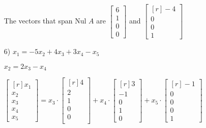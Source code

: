 \documentclass{article}
\begin{document}
\begin{enumerate}
      The vectors that span Nul $A$ are $\begin{bmatrix*}
      6\\1\\0\\0\end{bmatrix*}$ and $\begin{bmatrix*}[r]
      -4\\0\\0\\1\end{bmatrix*}$

    \item[6)] 
      $x_1 = -5x_2+4x_3+3x_4-x_5$

      $x_2 = 2x_3-x_4$

      $\begin{bmatrix*}[r]
        x_1\\x_2\\x_3\\x_4\\x_5\end{bmatrix*}
      =x_3\cdot\begin{bmatrix*}[r]
      4\\2\\1\\0\\0\\\end{bmatrix*}
      +x_4\cdot\begin{bmatrix*}[r]
      3\\-1\\0\\1\\0\end{bmatrix*}
      +x_5\cdot\begin{bmatrix*}[r]
      -1\\0\\0\\0\\1\end{bmatrix*}$


\end{enumerate}
\end{document}
